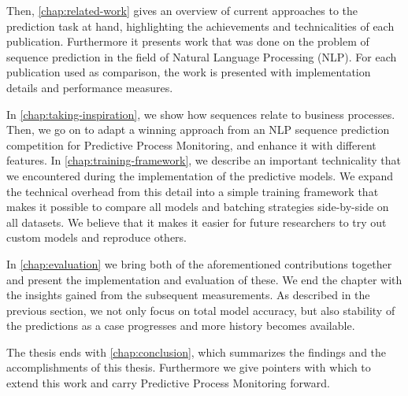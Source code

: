 Then, \autoref{chap:related-work} gives an overview of current approaches to the prediction task at hand, highlighting the achievements and technicalities of each publication. Furthermore it presents work that was done on the problem of sequence prediction in the field of Natural Language Processing (NLP). For each publication used as comparison, the work is presented with implementation details and performance measures.

In \autoref{chap:taking-inspiration}, we show how sequences relate to business processes. Then, we go on to adapt a winning approach from an NLP sequence prediction competition for Predictive Process Monitoring, and enhance it with different features. In \autoref{chap:training-framework}, we describe an important technicality that we encountered during the implementation of the predictive models. We expand the technical overhead from this detail into a simple training framework that makes it possible to compare all models and batching strategies side-by-side on all datasets. We believe that it makes it easier for future researchers to try out custom models and reproduce others.

In \autoref{chap:evaluation} we bring both of the aforementioned contributions together and present the implementation and evaluation of these. We end the chapter with the insights gained from the subsequent measurements. As described in the previous section, we not only focus on total model accuracy, but also stability of the predictions as a case progresses and more history becomes available.

The thesis ends with \autoref{chap:conclusion}, which summarizes the findings and the accomplishments of this thesis. Furthermore we give pointers with which to extend this work and carry Predictive Process Monitoring forward.
